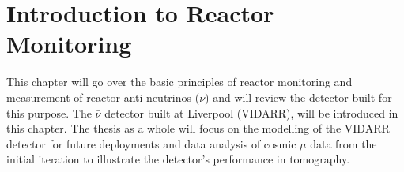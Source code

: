 
\ifpdf
    \graphicspath{{Chapter1/Figs/Raster/}{Chapter1/Figs/PDF/}{Chapter1/Figs/}}
\else
    \graphicspath{{Chapter1/Figs/Vector/}{Chapter1/Figs/}}
\fi

\chapter{Introduction to Reactor Monitoring} \label{Chap:theAimOfVidarr} %
This chapter will go over the basic principles of reactor monitoring and measurement of reactor anti-neutrinos ($\bar{\nu}$) and will review the detector built for this purpose. The $\bar{\nu}$ detector built at Liverpool (VIDARR), will be introduced in this chapter. The thesis as a whole will focus on the modelling of the VIDARR detector for future deployments and data analysis of cosmic $\mu$ data from the initial iteration to illustrate the detector's performance in tomography.

